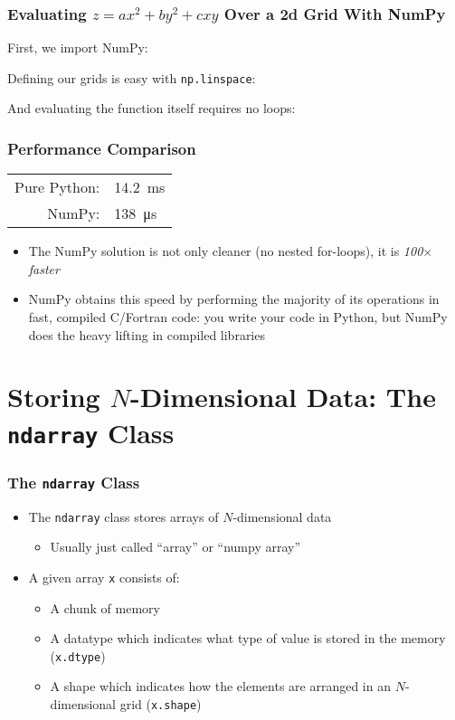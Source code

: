 \documentclass[xcolor={x11names,table}]{beamer}
\begin{document}
\begin{frame}
	\frametitle{Evaluating $z=ax^{2}+by^{2}+cxy$ Over a 2d Grid With NumPy}
	First, we import NumPy:
	
	
	Defining our grids is easy with \texttt{np.linspace}:
	
	
	And evaluating the function itself requires no loops:
	
\end{frame}

\begin{frame}
	\frametitle{Performance Comparison}
	\begin{center}
		\begin{tabular}{rl}
			Pure Python: & \SI{14.2}{ms}\\
			NumPy: & \SI{138}{\micro s}\\
		\end{tabular}
	\end{center}
	\begin{itemize}
		\item The NumPy solution is not only cleaner (no nested for-loops), it is \emph{100$\times$ faster}
		\item NumPy obtains this speed by performing the majority of its operations in fast, compiled C/Fortran code: you write your code in Python, but NumPy does the heavy lifting in compiled libraries
	\end{itemize}
\end{frame}

\section{Storing $N$-Dimensional Data: The \texttt{ndarray} Class}

\begin{frame}
	\frametitle{The \texttt{ndarray} Class}
	\begin{itemize}
		\item The \texttt{ndarray} class stores arrays of $N$-dimensional data
		\begin{itemize}
			\item Usually just called ``array'' or ``numpy array''
		\end{itemize}
		\item A given array \texttt{x} consists of:
		\begin{itemize}
			\item A chunk of memory
			\item A datatype which indicates what type of value is stored in the memory (\texttt{x.dtype})
			\item A shape which indicates how the elements are arranged in an $N$-dimensional grid (\texttt{x.shape})
		\end{itemize}
	\end{itemize}
\end{frame}
\end{document}
